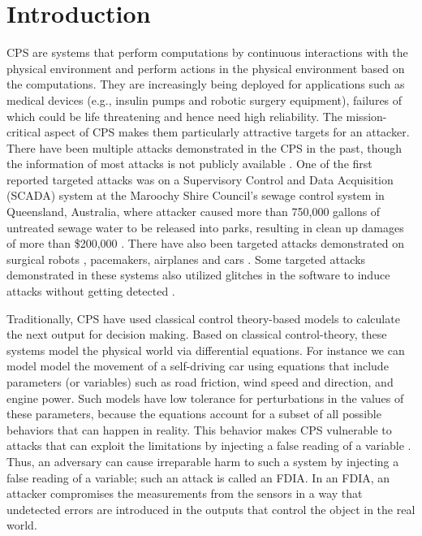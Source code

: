 
\chapter{Introduction }
\label{ch:Chapter1}
\ac{CPS} are systems that perform computations by continuous interactions with the physical environment and perform actions in the physical environment based on the computations.   
They are increasingly being deployed for applications \cite{10.1145/2038642.2038685}\cite{10.1145/1837274.1837463}\cite{6051465} such as medical devices (e.g., insulin pumps and robotic surgery equipment), failures of which could be life threatening and hence need high reliability. 
The mission-critical aspect of \ac{CPS} makes them particularly attractive targets for an attacker. 
There have been multiple attacks demonstrated in the \ac{CPS} in the past, though the information of most attacks is not publicly available \cite{doi:10.1080/13518040590969785}.
One of the first reported targeted attacks was on a Supervisory Control and Data Acquisition (SCADA) system \cite{article22} at the Maroochy Shire Council’s sewage control system in Queensland, Australia, where attacker caused more than 750,000 gallons of untreated sewage water to be released into parks, resulting in clean up damages of more than \$200,000 \cite{10.1016/j.adhoc.2009.04.012}.
There have also been targeted attacks demonstrated on surgical robots \cite{7579758}, pacemakers\cite{4531149}, airplanes \cite{217595} and  cars \cite{10.5555/1929820.1929848}.
Some targeted attacks demonstrated in these systems also utilized glitches in the software to induce attacks without getting detected \cite{242054}. 



Traditionally, \ac{CPS} have used classical control theory-based models \cite{6051465} \cite{1337806} \cite{10.1145/2038642.2038667}  to calculate the next output for decision making. 
Based on classical control-theory, these systems model the physical world via differential equations. 
For instance we can model model the movement of a self-driving car using equations that include parameters (or variables) such as road friction, wind speed and direction, and engine power. 
Such models have low tolerance for perturbations in the values of these parameters, because the equations account for a subset of all possible behaviors that can happen in reality. 
This behavior makes \ac{CPS} vulnerable to attacks that can exploit the limitations by injecting a false reading of a variable \cite{10.1145/1952982.1952995}. 
Thus, an adversary can cause irreparable harm to such a system by injecting a false reading of a variable; such an attack is called an \ac{FDIA}.
 In an \ac{FDIA}, an attacker compromises the measurements from the sensors in a way that undetected errors are introduced in the outputs \cite{7438916} that control the object in the real world. 
 



